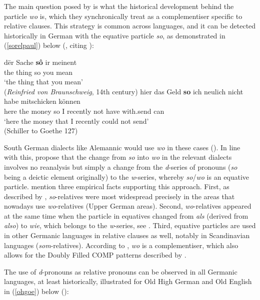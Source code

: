 The main question posed by \citet{brandnerbraeuning2013} is what the historical development behind the particle \textit{wo} is, which they synchronically treat as a complementiser specific to relative clauses. This strategy is common across languages, and it can be detected historically in German with the equative particle \textit{so}, as demonstrated in (\ref{sorelpaul}) below (\citealt[132, ex. 3 and 4]{brandnerbraeuning2013}, citing \citealt{paul1920band3}):

\ea \label{sorelpaul}
\ea \gll d\"er Sache \textbf{s\^{o}} ir meinent \label{reinfried}\\
the thing so you mean\\
\glt `the thing that you mean'\\(\textit{Reinfried von Braunschweig}, 14th century)
\ex \gll hier das Geld \textbf{so} ich neulich nicht habe mitschicken können\\
here the money so I recently not have with.send can\\
\glt `here the money that I recently could not send'\\(Schiller to Goethe 127)
\z
\z

South German dialects like Alemannic would use \textit{wo} in these cases (\citealt[132--133]{brandnerbraeuning2013}). In line with this, \citet[133]{brandnerbraeuning2013} propose that the change from \textit{so} into \textit{wo} in the relevant dialects involves no reanalysis but simply a change from the \textit{d}-series of pronouns (\textit{so} being a deictic element originally) to the \textit{w}-series, whereby \textit{so}/\textit{wo} is an equative particle. \citet[133]{brandnerbraeuning2013} mention three empirical facts supporting this approach. First, as described by \citet[238]{paul1920band3}, \textit{so}-relatives were most widespread precisely in the areas that nowadays use \textit{wo}-relatives (Upper German areas). Second, \textit{wo}-relatives appeared at the same time when the particle in equatives changed from \textit{als} (derived from \textit{also}) to \textit{wie}, which belongs to the \textit{w}-series, see \citet{jaeger2010}. Third, equative particles are used in other Germanic languages in relative clauses as well, notably in Scandinavian languages (\textit{som}-relatives). According to \citet[133]{brandnerbraeuning2013}, \textit{wo} is a complementiser, which also allows for the Doubly Filled COMP patterns described by \citet{bayer1984}.

The use of \textit{d}-pronouns as relative pronouns can be observed in all Germanic languages, at least historically, illustrated for Old High German and Old English in (\ref{ohgoe}) below (\citealt[134, ex. 7a and 7b]{brandnerbraeuning2013}):

